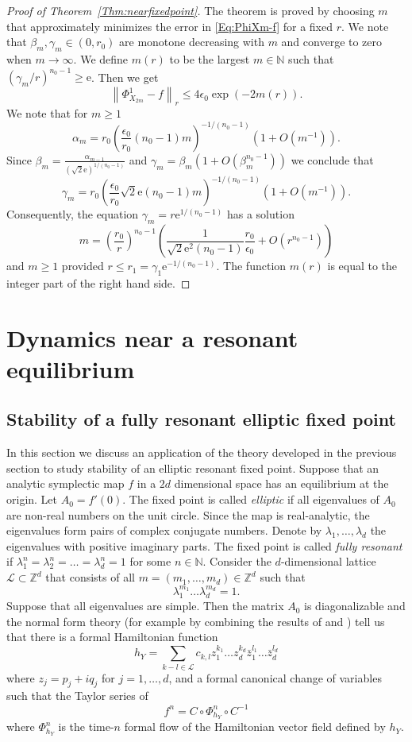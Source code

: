 \documentclass[a4paper,12pt]{article}
\newcommand{\N}{\mathbb{N}}
\newcommand{\Z}{\mathbb{Z}}
\begin{document}
\begin{proof}[Proof of Theorem~\ref{Thm:nearfixedpoint}]
The theorem is proved by choosing $m$  that approximately  minimizes the error in \eqref{Eq:PhiXm-f} for a fixed $r$.
We note that $\beta_m,\gamma_m\in(0,r_0)$  are monotone 
decreasing with $m$ and converge to zero when $m\to\infty$. We define $m(r)$ to be the 
largest $m\in\N$ such that $(\gamma_m/r)^{n_0-1}\ge \mathrm e $. Then 
we get  
\[
\left\|\Phi_{X_{2m}}^1-f\right\|_r
    \le
       4 \epsilon_0
        \exp(-2 m(r)).
\]
We note that for $m\ge1$
\[
\alpha_m
= {r_0}
{\left(\frac{\epsilon_0}{r_0}(n_0-1)m\right)^{-1/(n_0-1)}}
\left(1+O(m^{-1})\right).
\]
Since $\beta_m=\frac{\alpha_{m-1}}{(\sqrt 2\mathrm e)^{1/(n_0-1)}}$ 
and $\gamma_m=\beta_m\left(1+O(\beta_m^{n_0-1})\right)$ we conclude that
\[
\gamma_m= r_0\left(\frac{\epsilon_0}{r_0}\sqrt2 \mathrm e(n_0-1)m\right)^{-1/(n_0-1)}
\left(1+O(m^{-1})\right).
\]
Consequently, the equation ${\gamma_m}=r\mathrm e^{1/(n_0-1)}$ has a solution
\[
m=
\left(\frac{r_0}{r}\right)^{n_0-1}
\left(\frac{1}{ \sqrt 2  \mathrm e^2(n_0-1)}\frac{r_0}{\epsilon_0}
+O(r^{n_0-1})\right)
\]
and $m\ge1$ provided $r\le r_1=\gamma_1\mathrm e^{-1/(n_0-1)}$.
The function $m(r)$ is equal to the 
integer part of the right hand side.
\end{proof}


\section{Dynamics near a resonant equilibrium\label{Se:stability}}

\subsection{Stability of a fully resonant elliptic fixed point}

In this section we discuss an application of the theory developed in the previous section to 
study  stability of an elliptic resonant fixed point.
Suppose that an analytic symplectic map $f$ in a $2d$ dimensional space has
an equilibrium at the origin. Let $A_0=f'(0)$. 
The fixed point is called {\em elliptic\/} if all eigenvalues of $A_0$
are non-real numbers on the unit circle. 
Since the map is  real-analytic, the eigenvalues form pairs of 
complex conjugate numbers. Denote by $\lambda_1,\dots,\lambda_d$ the eigenvalues 
with positive imaginary parts.
 The fixed point is called {\em fully resonant\/}
if $\lambda_1^n=\lambda_2^n=\ldots=\lambda_d^n=1$ for some $n\in \N$.
Consider the $d$-dimensional lattice $\mathcal L\subset\Z^d$ that consists of all
 $m=(m_1,\dots,m_d)\in\Z^d$ such that
\[
\lambda_1^{m_1}\ldots\lambda_d^{m_d}=1.
\]
Suppose that all eigenvalues are simple. Then the matrix $A_0$ is diagonalizable and
the normal form theory (for example by combining the  results of \cite{Bazzani87} and \cite{BenettinG94})
tell us that there is  a formal Hamiltonian function 
\[
h_Y
=
\sum_{k-l\in\mathcal L}c_{k,l} z_1^{k_1}\ldots z_d^{k_d}\bar z_1^{l_1}\dots \bar z_d^{l_d}
\]
where $z_j=p_j+i q_j$ for $j=1,\ldots,d$, 
and a formal canonical change of variables 
such that the Taylor series of 
\[
f^n=C\circ \Phi^n_{h_Y}\circ C^{-1}
\]
where $\Phi^n_{h_Y}$ is the time-$n$ formal flow of the Hamiltonian
vector field defined by  $h_Y$.
\end{document}

